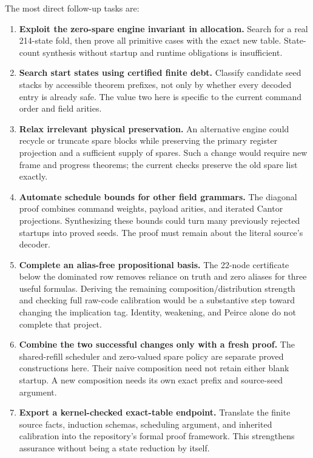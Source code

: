 \documentclass[11pt,letterpaper]{article}
\theoremstyle{definition}
\begin{document}
The most direct follow-up tasks are:
\begin{enumerate}
\item \textbf{Exploit the zero-spare engine invariant in allocation.}
Search for a real 214-state fold, then prove all primitive cases with
the exact new table.  State-count synthesis without startup and
runtime obligations is insufficient.
\item \textbf{Search start states using certified finite debt.}
Classify candidate seed stacks by accessible theorem prefixes, not
only by whether every decoded entry is already safe.  The value two
here is specific to the current command order and field arities.
\item \textbf{Relax irrelevant physical preservation.}
An alternative engine could recycle or truncate spare blocks while
preserving the primary register projection and a sufficient supply of
spares.  Such a change would require new frame and progress theorems;
the current checks preserve the old spare list exactly.
\item \textbf{Automate schedule bounds for other field grammars.}
The diagonal proof combines command weights, payload arities, and
iterated Cantor projections.  Synthesizing these bounds could turn
many previously rejected startups into proved seeds.  The proof must
remain about the literal source's decoder.
\item \textbf{Complete an alias-free propositional basis.}
The 22-node certificate below the dominated row removes reliance on
truth and zero aliases for three useful formulas.  Deriving the
remaining composition/distribution strength and checking full
raw-code calibration would be a substantive step toward changing
the implication tag.  Identity, weakening, and Peirce alone do not
complete that project.
\item \textbf{Combine the two successful changes only with a fresh proof.}
The shared-refill scheduler and zero-valued spare policy are separate
proved constructions here.  Their naive composition need not retain
either blank startup.  A new composition needs its own exact prefix
and source-seed argument.
\item \textbf{Export a kernel-checked exact-table endpoint.}
Translate the finite source facts, induction schemas, scheduling
argument, and inherited calibration into the repository's formal
proof framework.  This strengthens assurance without being a state
reduction by itself.
\end{enumerate}
\end{document}
